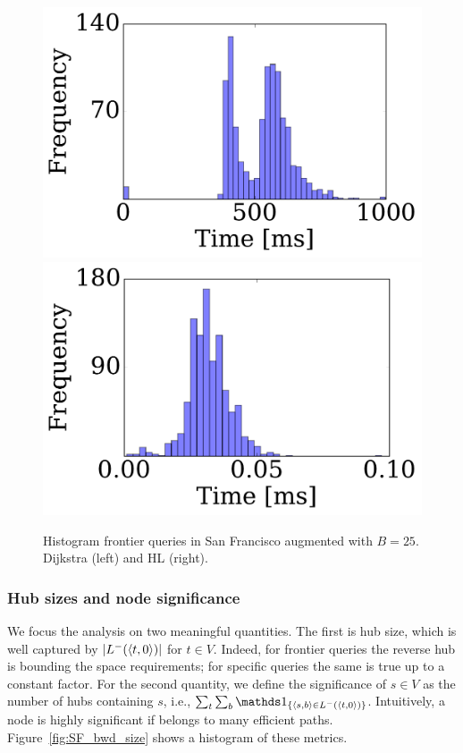 \begin{figure}
\begin{center}
\includegraphics[clip, trim=0.2cm 0.3cm 0.2cm 0.2cm,scale=0.26]{TexImg/SF_query_dij_B25.pdf}
\includegraphics[clip, trim=1.3cm 0.3cm 0.2cm 0.2cm,scale=0.26]{TexImg/SF_query_hl_B25.pdf}
\end{center}
\caption{Histogram frontier queries in San Francisco augmented with $B=25$. Dijkstra (left) and HL (right).}
\label{fig:SF_query}
\end{figure}



\subsubsection{Hub sizes and node significance}

We focus the analysis on two meaningful quantities.
The first is hub size, which is well captured by  $\lvert L^-(\langle t,0\rangle)\rvert$ for $t\in V$.
Indeed, for frontier queries the reverse hub is bounding the space requirements; for specific queries the same is true up to a constant factor.
For the second quantity, we define the significance of $s\in V$ as the number of hubs containing $s$, i.e., $\sum_t\sum_b\In{\pp{s,b}\in \Lb(\pp{t,0})}$.
Intuitively, a node is highly significant if belongs to many efficient paths.
Figure~\ref{fig:SF_bwd_size} shows a histogram of these metrics. 

